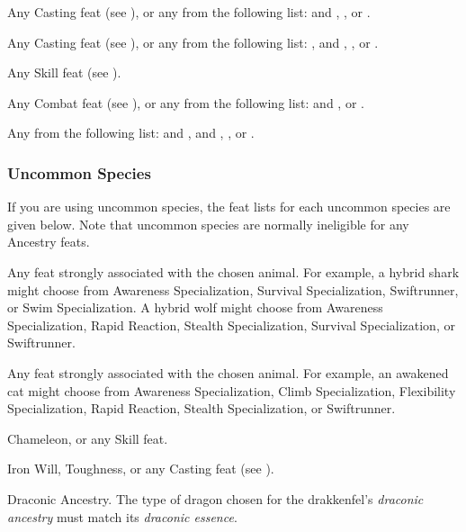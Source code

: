          Any Casting feat (see ), or any from the following list:  and , , or .

         Any Casting feat (see ), or any from the following list: ,  and , , or .

         Any Skill feat (see ).

         Any Combat feat (see ), or any from the following list:  and , or .

         Any from the following list:  and ,  and , , or .

        \subsubsection{Uncommon Species}
            If you are using uncommon species, the feat lists for each uncommon species are given below.
            Note that uncommon species are normally ineligible for any Ancestry feats.

             Any feat strongly associated with the chosen animal. For example, a hybrid shark might choose from Awareness Specialization, Survival Specialization, Swiftrunner, or Swim Specialization. A hybrid wolf might choose from Awareness Specialization, Rapid Reaction, Stealth Specialization, Survival Specialization, or Swiftrunner.

             Any feat strongly associated with the chosen animal. For example, an awakened cat might choose from Awareness Specialization, Climb Specialization, Flexibility Specialization, Rapid Reaction, Stealth Specialization, or Swiftrunner.

             Chameleon, or any Skill feat.

             Iron Will, Toughness, or any Casting feat (see ).

             Draconic Ancestry. The type of dragon chosen for the drakkenfel's \textit{draconic ancestry} must match its \textit{draconic essence}.

